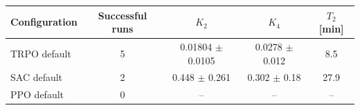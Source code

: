 \begin{tabular}{lcccc}
\toprule
Configuration & Successful runs & $K_2$ & $K_4$ & $T_2$ [min] \\
\midrule
TRPO default & 5 & 0.01804 $\pm$ 0.0105 & 0.0278 $\pm$ 0.012 & 8.5 \\
SAC default & 2 & 0.448 $\pm$ 0.261 & 0.302 $\pm$ 0.18 & 27.9 \\
PPO default & 0 & -- & -- & -- \\
\bottomrule
\end{tabular}
